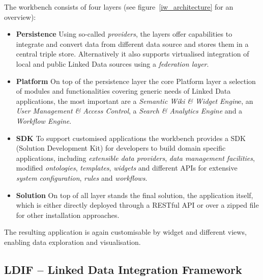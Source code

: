 The workbench consists of four layers (see figure~\ref{iw_architecture} for an overview):~\cite{haase2011information}~\cite{gossenainformation}

\begin{itemize}
\item \textbf{Persistence}
Using so-called \emph{providers}, the layers offer capabilities to integrate and convert data from different data source and stores them in a central triple store. Alternatively it also supports virtualised integration of local and public Linked Data sources using a \emph{federation layer}.
\item \textbf{Platform}
On top of the persistence layer the core Platform layer a selection of modules and functionalities covering generic needs of Linked Data applications, the most important are a \emph{Semantic Wiki \& Widget Engin}e, an \emph{User Management \& Access Control}, a \emph{Search \& Analytics Engine} and a \emph{Workflow Engine}.
\item \textbf{SDK} To support customised applications the workbench provides a SDK (Solution Development Kit) for developers to build domain specific applications, including \emph{extensible data providers}, \emph{data management facilities}, modified \emph{ontologies}, \emph{templates}, \emph{widgets} and different APIs for extensive \emph{system configuration}, \emph{rules} and \emph{workflows}.
\item \textbf{Solution}
On top of all layer stands the final solution, the application itself, which is either directly deployed through a RESTful API or over a zipped file for other installation approaches.
\end{itemize}

The resulting application is again customisable by widget and different views, enabling data exploration and visualisation.

\subsection{LDIF – Linked Data Integration Framework}

